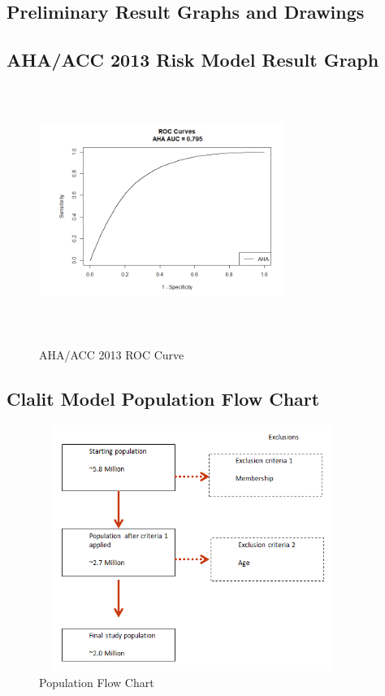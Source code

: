 \documentclass[a4paper,12pt]{article}
\begin{document}
\begin{appendices}
   		\section{Preliminary Result Graphs and Drawings}
   			\subsection{AHA/ACC 2013 Risk Model  Result Graph}
	   		\begin{figure}[H]
   				\includegraphics[width=8cm, height=8cm]{prelim-results/AHA/AHA_ROC.png}
   				\label{AHAROC}
   				\captionsetup{justification=justified,singlelinecheck=false,margin=1cm}
   				\caption{AHA/ACC 2013 ROC Curve}
	   		\end{figure}
   		
   			\subsection{Clalit Model Population Flow Chart}
   			\begin{figure}[H]
	   			\includegraphics[width=10cm,height=8cm]{prelim-results/Panpredictor/pop_flow_chart.png}
	   			\captionsetup{justification=justified,singlelinecheck=false,margin=2cm}
	   			\caption{Population Flow Chart}
	   		\end{figure}
   		
   	\end{appendices}
	
\end{document}

